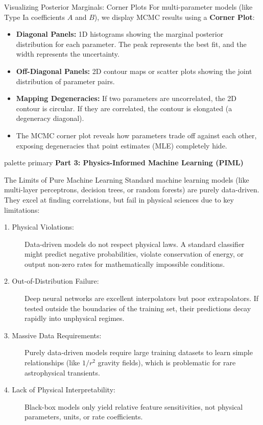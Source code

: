 \documentclass[9pt]{beamer}
\begin{document}
\begin{frame}{Visualizing Posterior Marginals: Corner Plots}
  For multi-parameter models (like Type Ia coefficients $A$ and $B$), we display MCMC results using a \textbf{Corner Plot}:
  \begin{itemize}
    \item \textbf{Diagonal Panels:} 1D histograms showing the marginal posterior distribution for each parameter. The peak represents the best fit, and the width represents the uncertainty.
    \item \textbf{Off-Diagonal Panels:} 2D contour maps or scatter plots showing the joint distribution of parameter pairs.
    \item \textbf{Mapping Degeneracies:}
      If two parameters are uncorrelated, the 2D contour is circular. If they are correlated, the contour is elongated (a degeneracy diagonal).
    \item The MCMC corner plot reveals how parameters trade off against each other, exposing degeneracies that point estimates (MLE) completely hide.
  \end{itemize}
\end{frame}

\begin{frame}[plain]
  \vfill
  \centering
  \begin{beamercolorbox}[sep=8pt,center,shadow=true,rounded=true]{palette primary}
    \textbf{Part 3: Physics-Informed Machine Learning (PIML)}
  \end{beamercolorbox}
  \vfill
\end{frame}

\begin{frame}{The Limits of Pure Machine Learning}
  Standard machine learning models (like multi-layer perceptrons, decision trees, or random forests) are purely data-driven. They excel at finding correlations, but fail in physical sciences due to key limitations:
  \begin{description}
    \item[1. Physical Violations:] Data-driven models do not respect physical laws. A standard classifier might predict negative probabilities, violate conservation of energy, or output non-zero rates for mathematically impossible conditions.
    \item[2. Out-of-Distribution Failure:] Deep neural networks are excellent interpolators but poor extrapolators. If tested outside the boundaries of the training set, their predictions decay rapidly into unphysical regimes.
    \item[3. Massive Data Requirements:] Purely data-driven models require large training datasets to learn simple relationships (like $1/r^2$ gravity fields), which is problematic for rare astrophysical transients.
    \item[4. Lack of Physical Interpretability:] Black-box models only yield relative feature sensitivities, not physical parameters, units, or rate coefficients.
  \end{description}
\end{frame}
\end{document}
